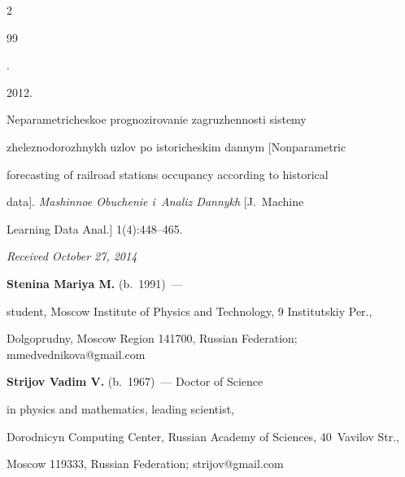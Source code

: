 \begin{multicols}{2}
{{\begin{thebibliography}{99}

.

2012.

    Neparametricheskoe prognozirovanie zagruzhennosti sistemy

    zheleznodorozhnykh uzlov po istoricheskim dannym [Nonparametric

    forecasting of railroad stations occupancy according to historical

    data]. \textit{Mashinnoe Obuchenie i~Analiz Dannykh} [J.~Machine

    Learning Data Anal.] 1(4):448--465.



    \end{thebibliography}



 }

 }



\end{multicols}



\vspace*{-3pt}



\hfill{\small\textit{Received October 27, 2014}}






    \Contr





    \noindent

    \textbf{Stenina Mariya M.} (b.\ 1991)~---

    student, Moscow Institute of Physics and Technology, 9 Institutskiy Per.,

    Dolgoprudny, Moscow Region 141700, Russian Federation; mmedvednikova@gmail.com



    \vspace*{3pt}



    \noindent

    \textbf{Strijov Vadim V.} (b.\ 1967)~--- Doctor of Science

    in physics and mathematics, leading scientist,

    Dorodnicyn Computing Center, Russian Academy of Sciences, 40~Vavilov Str.,

    Moscow 119333, Russian Federation; strijov@gmail.com













\label{end\stat}





\renewcommand{\bibname}{\protect\rm Литература}